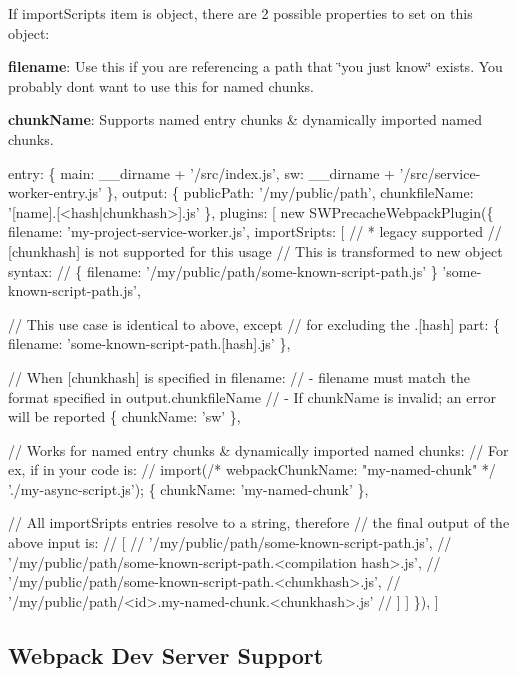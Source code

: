 If {\ttfamily import\+Scripts} item is object, there are 2 possible properties to set on this object\+:
\begin{DoxyItemize}
\item {\bfseries filename}\+: Use this if you are referencing a path that \char`\"{}you just know\char`\"{} exists. You probably don\textquotesingle{}t want to use this for named chunks.
\item {\bfseries chunk\+Name}\+: Supports named entry chunks \& dynamically imported named chunks. 
\begin{DoxyCode}
entry: \{
  main: \_\_dirname + '/src/index.js',
  sw: \_\_dirname + '/src/service-worker-entry.js'
\},
output: \{
  publicPath: '/my/public/path',
  chunkfileName: '[name].[<hash|chunkhash>].js'
\},
plugins: [
  new SWPrecacheWebpackPlugin(\{
    filename: 'my-project-service-worker.js',
    importSripts: [
      // * legacy supported
      // [chunkhash] is not supported for this usage
      // This is transformed to new object syntax:
      // \{ filename: '/my/public/path/some-known-script-path.js' \}
      'some-known-script-path.js',

      // This use case is identical to above, except
      // for excluding the .[hash] part:
      \{ filename: 'some-known-script-path.[hash].js' \},

      // When [chunkhash] is specified in filename:
      // - filename must match the format specified in output.chunkfileName
      // - If chunkName is invalid; an error will be reported
      \{ chunkName: 'sw' \},

      // Works for named entry chunks & dynamically imported named chunks:
      // For ex, if in your code is:
      // import(/* webpackChunkName: "my-named-chunk" */ './my-async-script.js');
      \{ chunkName: 'my-named-chunk' \},

      // All importSripts entries resolve to a string, therefore
      // the final output of the above input is:
      // [
      //   '/my/public/path/some-known-script-path.js',
      //   '/my/public/path/some-known-script-path.<compilation hash>.js',
      //   '/my/public/path/some-known-script-path.<chunkhash>.js',
      //   '/my/public/path/<id>.my-named-chunk.<chunkhash>.js'
      // ]
    ]
  \}),
]
\end{DoxyCode}

\end{DoxyItemize}

\subsection*{Webpack Dev Server Support}

